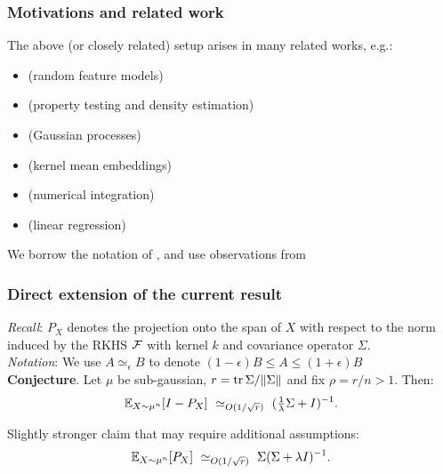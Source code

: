 \documentclass[10pt]{beamer}
\begin{document}
\begin{frame}
  \frametitle{Motivations and related work}
  The above (or closely related) setup arises in many related works, e.g.:
  \begin{itemize}
  \item \cite{bach2017equivalence} (random feature models)
  \item \cite{smola2007hilbert} (property testing and density estimation)
  \item \cite{sparse-variational-gp} (Gaussian processes)
  \item \cite{muandet2017kernel} (kernel mean embeddings)
  \item \cite{belhadji2019kernel} (numerical integration)
  \item \cite{BLLT19_TR} (linear regression)
  \end{itemize}
  \vspace{5mm}
  
We borrow the notation of \cite{bach2017equivalence}, and use
observations from \cite{belhadji2019kernel}
\end{frame}

\begin{frame}
  \frametitle{ Direct extension of the current result}
  \emph{Recall}: $P_X$ denotes the projection onto the span of $X$
  with respect to the norm induced by the RKHS $\mathcal{F}$ with kernel $k$
  and covariance operator $\Sigma$.\\[5mm]

 \emph{Notation}: We use $A\simeq_{\epsilon}B$ to denote
 $(1-\epsilon)B\leq A\leq(1+\epsilon)B$
 \\[5mm]

  \textbf{Conjecture}.
Let $\mu$ be sub-gaussian,
  $r=\mathrm{tr}\,\Sigma/\|\Sigma\|$ and fix $\rho=r/n>1$. Then:
  \begin{align*}
\mathbb E_{X\sim\mu^n}[I-P_X]\ \simeq_{O(1/\sqrt r)}\ (\tfrac1\lambda\Sigma+ I)^{-1}.
  \end{align*}
  \vspace{5mm}
  
Slightly stronger claim that may require additional
  assumptions:
  \begin{align*}
\mathbb E_{X\sim\mu^n}[P_X]\ \simeq_{O(1/\sqrt r)}\ \Sigma(\Sigma+ \lambda I)^{-1}.
  \end{align*}
\end{frame}
\end{document}

